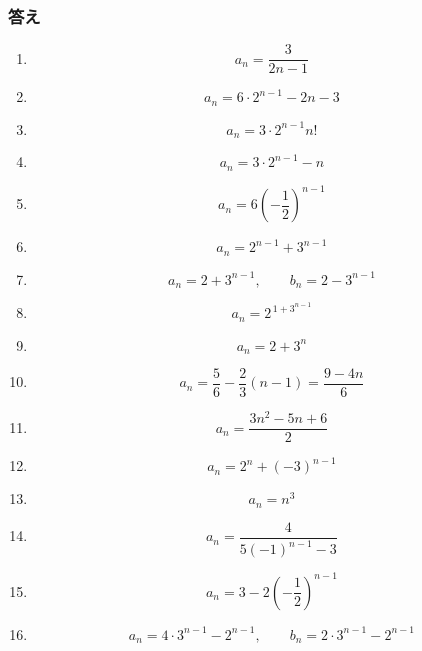       \subsubsection{答え}\label{節：標準難易度：解答}\label{節：基本と応用から出題されるもの：解答}
        \begin{enumerate}[label=\textbf{問\arabic*.},leftmargin=3.8em,format=\bookitemlink{practice-basic}{answer}{problem}]
          \item \[
                  a_n=\frac{3}{2n-1}
                \]
          \item \[
                  a_n=6\cdot2^{n-1}-2n-3
                \]
          \item \[
                  a_n=3\cdot2^{n-1}n!
                \]
          \item \[
                  a_n=3\cdot2^{n-1}-n
                \]
          \item \[
                  a_n=6\left(-\frac12\right)^{n-1}
                \]
          \item \[
                  a_n=2^{n-1}+3^{n-1}
                \]
          \item \[
                  a_n=2+3^{n-1},\qquad b_n=2-3^{n-1}
                \]
          \item \[
                  a_n=2^{\,1+3^{n-1}}
                \]
          \item \[
                  a_n=2+3^n
                \]
          \item \[
                  a_n=\frac56-\frac23(n-1)=\frac{9-4n}{6}
                \]
          \item \[
                  a_n=\frac{3n^2-5n+6}{2}
                \]
          \item \[
                  a_n=2^n+(-3)^{n-1}
                \]
          \item \[
                  a_n=n^3
                \]
          \item \[
                  a_n=\frac4{5(-1)^{n-1}-3}
                \]
          \item \[
                  a_n=3-2\left(-\frac12\right)^{n-1}
                \]
          \item \[
                  a_n=4\cdot3^{n-1}-2^{n-1},\qquad b_n=2\cdot3^{n-1}-2^{n-1}
                \]

\end{enumerate}
